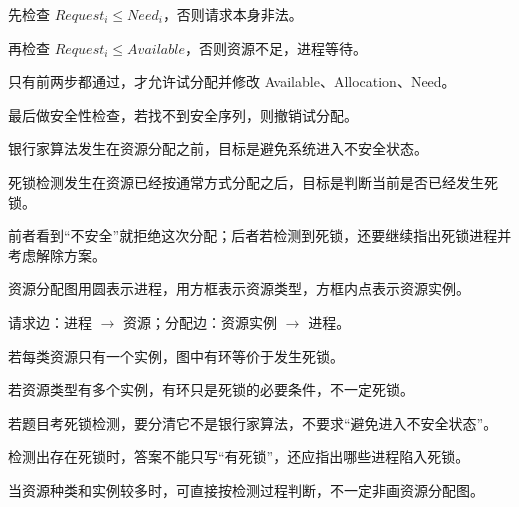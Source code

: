 \begin{points}
  \item 先检查 $Request_i\le Need_i$，否则请求本身非法。
  \item 再检查 $Request_i\le Available$，否则资源不足，进程等待。
  \item 只有前两步都通过，才允许试分配并修改 Available、Allocation、Need。
  \item 最后做安全性检查，若找不到安全序列，则撤销试分配。
\end{points}


\begin{points}
  \item 银行家算法发生在资源分配之前，目标是避免系统进入不安全状态。
  \item 死锁检测发生在资源已经按通常方式分配之后，目标是判断当前是否已经发生死锁。
  \item 前者看到“不安全”就拒绝这次分配；后者若检测到死锁，还要继续指出死锁进程并考虑解除方案。
\end{points}


\begin{points}
  \item 资源分配图用圆表示进程，用方框表示资源类型，方框内点表示资源实例。
  \item 请求边：进程 $\rightarrow$ 资源；分配边：资源实例 $\rightarrow$ 进程。
  \item 若每类资源只有一个实例，图中有环等价于发生死锁。
  \item 若资源类型有多个实例，有环只是死锁的必要条件，不一定死锁。
\end{points}


\begin{points}
  \item 若题目考死锁检测，要分清它不是银行家算法，不要求“避免进入不安全状态”。
  \item 检测出存在死锁时，答案不能只写“有死锁”，还应指出哪些进程陷入死锁。
  \item 当资源种类和实例较多时，可直接按检测过程判断，不一定非画资源分配图。
\end{points}


